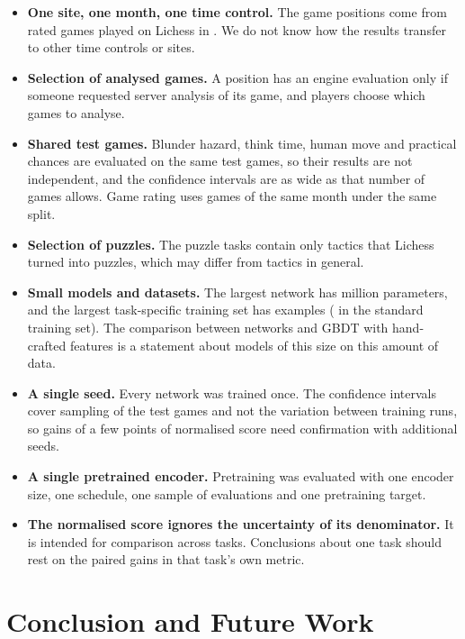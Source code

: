 \documentclass[11pt]{article}
\begin{document}
\begin{itemize}
\item \textbf{One site, one month, one time control.} The game positions
come from rated  games played on Lichess in
. We do not know how the results transfer to
other time controls or sites.
\item \textbf{Selection of analysed games.} A position has an engine
evaluation only if someone requested server analysis of its game, and
players choose which games to analyse.
\item \textbf{Shared test games.} Blunder hazard, think time, human move and
practical chances are evaluated on the same
 test games, so their results are not
independent, and the confidence intervals are as wide as that number of
games allows. Game rating uses games of the same month under the same split.
\item \textbf{Selection of puzzles.} The puzzle tasks contain only tactics
that Lichess turned into puzzles, which may differ from tactics in general.
\item \textbf{Small models and datasets.} The largest network has
 million parameters, and the
largest task-specific training set has
 examples
( in the standard training set). The
comparison between
networks and GBDT with hand-crafted features is a statement about models of
this size on this amount of data.
\item \textbf{A single seed.} Every network was trained once. The
confidence intervals cover sampling of the test games and not the variation
between training runs, so gains of a few points of normalised score need
confirmation with additional seeds.
\item \textbf{A single pretrained encoder.} Pretraining was evaluated with
one encoder size, one schedule, one sample of evaluations and one
pretraining target.
\item \textbf{The normalised score ignores the uncertainty of its
denominator.} It is intended for comparison across tasks. Conclusions about
one task should rest on the paired gains in that task's own metric.
\end{itemize}

\section{Conclusion and Future Work}
\label{sec:next}
\end{document}
